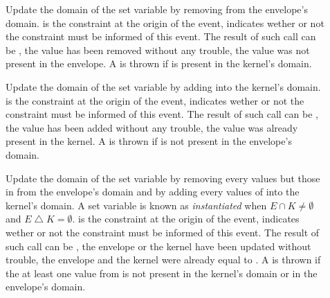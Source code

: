 \begin{description}
\item[ ] 

Update the domain of the set variable by removing  from the envelope's domain.  is the constraint at the origin of the event,  indicates wether or not the  constraint must be informed of this event. The result of such call can be , the value has been removed without any trouble,  the value was not present in the envelope. A  is thrown if  is present in the kernel's domain.

\item[ ] 

Update the domain of the set variable by adding  into the kernel's domain.  is the constraint at the origin of the event,  indicates wether or not the  constraint must be informed of this event. The result of such call can be , the value has been added without any trouble,  the value was already present in the kernel. A  is thrown if  is not present in the envelope's domain.

\item[ ]  

Update the domain of the set variable by removing every values but those in  from the envelope's domain and by adding every values of  into the kernel's domain. A set variable is known as \textit{instantiated} when $E \cap K \ne \emptyset $ and $E \bigtriangleup K = \emptyset$. 
 is the constraint at the origin of the event,  indicates wether or not the  constraint must be informed of this event. The result of such call can be , the envelope or the kernel have been updated without trouble,  the envelope and the kernel were already equal to  . A  is thrown if the at least one value from  is not present in the kernel's domain or in the envelope's domain.
 
\end{description}

